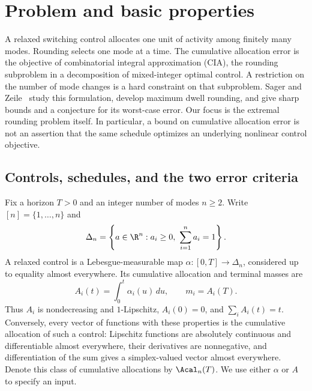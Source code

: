 \section{Problem and basic properties}\label{sec:foundations}

A relaxed switching control allocates one unit of activity among finitely many
modes. Rounding selects one mode at a time. The cumulative allocation error is
the objective of combinatorial integral approximation (CIA), the rounding
subproblem in a decomposition of mixed-integer optimal control. A restriction
on the number of mode changes is a hard constraint on that subproblem.
Sager and Zeile~\cite{sager-zeile2021} study this formulation, develop maximum
dwell rounding, and give sharp bounds and a conjecture for its worst-case
error. Our focus is the extremal rounding problem itself. In particular, a
bound on cumulative allocation error is not an assertion that the same
schedule optimizes an underlying nonlinear control objective.

\subsection{Controls, schedules, and the two error criteria}

Fix a horizon $T>0$ and an integer number of modes $n\ge2$. Write
$[n]=\{1,\ldots,n\}$ and
\[
 \Delta_n=\left\{a\in\R^n:a_i\ge0,\ \sum_{i=1}^n a_i=1\right\}.
\]
A relaxed control is a Lebesgue-measurable map
$\alpha:[0,T]\to\Delta_n$, considered up to equality almost everywhere.
Its cumulative allocation and terminal masses are
\begin{equation}\label{eq:cumulatives}
 A_i(t)=\int_0^t\alpha_i(u)\,du,\qquad m_i=A_i(T).
\end{equation}
Thus $A_i$ is nondecreasing and $1$-Lipschitz, $A_i(0)=0$, and
$\sum_i A_i(t)=t$. Conversely, every vector of functions with these properties
is the cumulative allocation of such a control: Lipschitz functions are
absolutely continuous and differentiable almost everywhere, their derivatives
are nonnegative, and differentiation of the sum gives a simplex-valued
vector almost everywhere. Denote this class of cumulative allocations by
$\Acal_n(T)$. We use either $\alpha$ or $A$ to specify an input.

